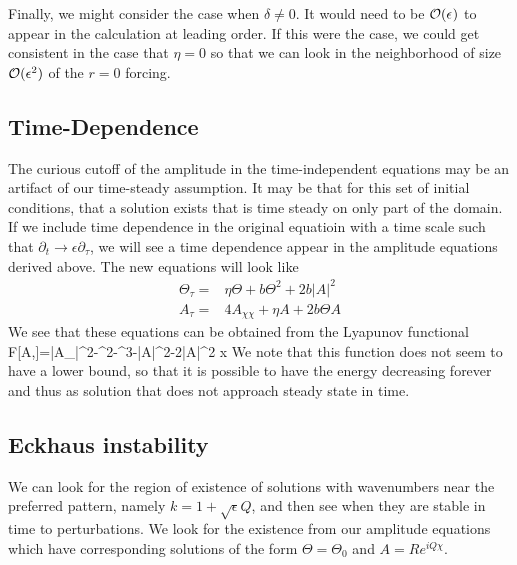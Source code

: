 \documentclass[../main/WavelengthCompetition.tex]{subfiles}
\begin{document}
Finally, we might consider the case when $\delta \neq 0$.  It would need to be $\mathcal{O}(\epsilon^{})$ to appear in the calculation at leading order.  If this were the case, we could get consistent in the case that $\eta=0$ so that we can look in the neighborhood of size $\mathcal{O}(\epsilon^{2})$  of the $r=0$ forcing.

\subsection{Time-Dependence}

The curious cutoff of the amplitude in the time-independent equations may be an artifact of our time-steady assumption.  It may be that for this set of initial conditions, that a solution exists that is time steady on only part of the domain.  If we include time dependence in the original equatioin with a time scale such that $\partial_t \rightarrow \epsilon \partial_{\tau}$, we will see a time dependence appear in the amplitude equations derived above.  The new equations will look like
\begin{subequations}
\begin{align}
\Theta_{\tau}=& \eta \Theta+b\Theta^2+2b| A|^2 \\
A_{\tau}=& 4 A_{\chi\chi}+\eta A +2 b \Theta A 
\end{align}
\end{subequations}
We see that these equations can be obtained from the Lyapunov functional
\beqn
F[A,\Theta]=|A_{\chi}|^2-\Theta^2-\Theta^3-\eta |A|^2-2\Theta |A|^2 \; x
\eeqn
We note that this function does not seem to have a lower bound, so that it is possible to have the energy decreasing forever and thus as solution that does not approach steady state in time.

\subsection{Eckhaus instability}

We can look for the region of existence of solutions with wavenumbers near the preferred pattern, namely $k=1+\sqrt{\epsilon}Q$, and then see when they are stable in time to perturbations.  We look for the existence from our amplitude equations which have corresponding solutions of the form $\Theta=\Theta_0$ and $A=R e^{iQ\chi}$.  
\end{document}
